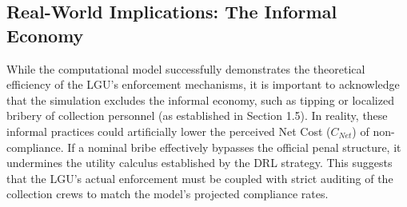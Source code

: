\subsection{Real-World Implications: The Informal Economy}
While the computational model successfully demonstrates the theoretical efficiency of the LGU's enforcement mechanisms, it is important to acknowledge that the simulation excludes the informal economy, such as tipping or localized bribery of collection personnel (as established in Section 1.5). In reality, these informal practices could artificially lower the perceived Net Cost ($C_{Net}$) of non-compliance. If a nominal bribe effectively bypasses the official penal structure, it undermines the utility calculus established by the DRL strategy. This suggests that the LGU's actual enforcement must be coupled with strict auditing of the collection crews to match the model's projected compliance rates.